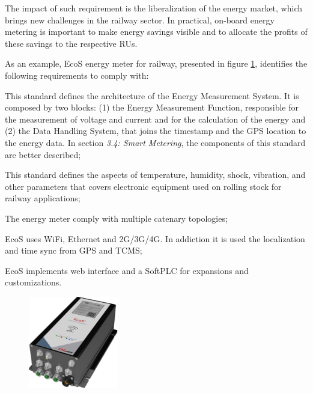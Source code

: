 	The impact of such requirement is the liberalization of the energy market, which brings new challenges in the railway sector. In practical, on-board energy metering is important to make energy savings visible and to allocate the profits of these savings to the respective RUs.
	
	As an example, EcoS energy meter for railway, presented in figure \ref{fig:ecos}, identifies the following requirements to comply with:
	
	\begin{description}
	\setlength\itemsep{-0em}
	
	\item [EN 50463 standard \cite{EN50463}] This standard defines the architecture of the Energy Measurement System. It is composed by two blocks: (1) the Energy Measurement Function, responsible for the measurement of voltage and current and for the calculation of the energy and (2) the Data Handling System, that joins the timestamp and the GPS location to the energy data. In section \textit{3.4: Smart Metering}, the components of this standard are better described;
	
	\item [EN 50155 standard \cite{EN50155}] This standard defines the aspects of temperature, humidity, shock, vibration, and other parameters that covers electronic equipment used on rolling stock for railway applications;
	
	\item [\ac{AC} and \ac{DC} measurement channels] The energy meter comply with multiple catenary topologies;
	
	\item [Multiple Connectivity] EcoS uses WiFi, Ethernet and 2G/3G/4G. In addiction it is used the localization and time sync from \ac{GPS} and \ac{TCMS};
	
	\item [Multiple access and customization] EcoS implements web interface and a SoftPLC for expansions and customizations.
	\end{description}



\begin{figure}[h!]
	\centering
	\begin{minipage}{.8\textwidth}
		\centering
		\includegraphics[width=0.35\textwidth,keepaspectratio]{figures/32.EnergyS/ecos}
		\label{fig:ecos}
	\end{minipage}
\end{figure}

